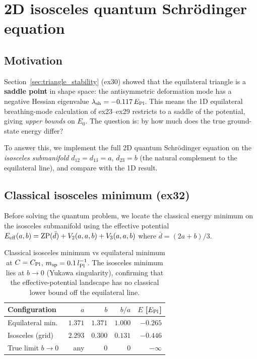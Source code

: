 \section{2D isosceles quantum Schr\"odinger equation}
\label{sec:2d_isosceles}

\subsection{Motivation}

Section~\ref{sec:triangle_stability} (ex30) showed that the equilateral
triangle is a \textbf{saddle point} in shape space: the antisymmetric
deformation mode has a negative Hessian eigenvalue
$\lambda_{\rm sh} = -0.117\,E_{\rm Pl}$.
This means the 1D equilateral breathing-mode calculation of ex23--ex29
restricts to a saddle of the potential, giving \emph{upper bounds} on $E_0$.
The question is: by how much does the true ground-state energy differ?

To answer this, we implement the full 2D quantum Schr\"odinger equation
on the \emph{isosceles submanifold} $d_{12}=d_{13}=a$, $d_{23}=b$
(the natural complement to the equilateral line), and compare with the 1D result.

\subsection{Classical isosceles minimum (ex32)}

Before solving the quantum problem, we locate the classical energy minimum
on the isosceles submanifold using the effective potential
$E_{\rm eff}(a,b) = \text{ZP}(\bar{d}) + V_2(a,a,b) + V_3(a,a,b)$
where $\bar{d}=(2a+b)/3$.

\begin{table}[h]
\centering
\caption{Classical isosceles minimum vs equilateral minimum at $C=C_{\rm Pl}$,
$m_{\rm sp}=0.1\,l_{\rm Pl}^{-1}$.  The isosceles minimum lies at $b\to 0$
(Yukawa singularity), confirming that the effective-potential landscape has no
classical lower bound off the equilateral line.}
\label{tab:iso_classical}
\begin{tabular}{lrrrr}
\hline
Configuration & $a$ & $b$ & $b/a$ & $E$ [$E_{\rm Pl}$] \\
\hline
Equilateral min.\ & $1.371$ & $1.371$ & $1.000$ & $-0.265$ \\
Isosceles (grid) & $2.293$ & $0.300$ & $0.131$ & $-0.446$ \\
True limit $b\to0$ & any & $0$ & $0$ & $-\infty$ \\
\hline
\end{tabular}
\end{table}

